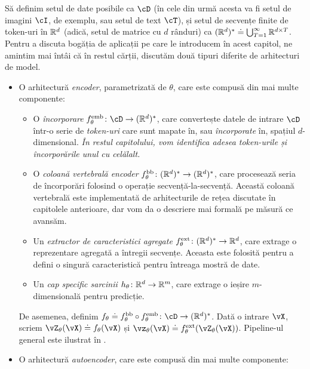 \documentclass[../../book-main_ro.tex]{subfiles}
\begin{document}
Să definim setul de date posibile ca \(\cD\) (în cele din urmă acesta va fi setul de imagini \(\cI\), de exemplu, sau setul de text \(\cT\)), și setul de secvențe finite de token-uri în \(\mathbb{R}^{d}\) (adică, setul de matrice cu \(d\) rânduri) ca \((\mathbb{R}^{d})^{*} \doteq \bigcup_{T = 1}^{\infty}\mathbb{R}^{d \times T}\). Pentru a discuta bogăția de aplicații pe care le introducem în acest capitol, ne amintim mai întâi că în restul cărții, discutăm două tipuri diferite de arhitecturi de model.
\begin{itemize}
    \item O arhitectură \textit{encoder}, parametrizată de \(\theta\), care este compusă din mai multe componente:
    \begin{itemize}
        \item O \textit{încorporare} \(f_{\theta}^{\emb} \colon \cD \to (\R^{d})^{*}\), care convertește datele de intrare \(\cD\) într-o serie de \textit{token-uri} care sunt mapate în, sau \textit{încorporate} în, spațiul \(d\)-dimensional. \textit{În restul capitolului, vom identifica adesea token-urile și încorporările unul cu celălalt.}
        \item O \textit{coloană vertebrală encoder} \(f_{\theta}^{\mathrm{bb}} \colon (\mathbb{R}^{d})^{*} \to (\mathbb{R}^{d})^{*}\), care procesează seria de încorporări folosind o operație secvență-la-secvență. Această coloană vertebrală este implementată de arhitecturile de rețea discutate în capitolele anterioare, dar vom da o descriere mai formală pe măsură ce avansăm.
        \item Un \textit{extractor de caracteristici agregate} \(f_{\theta}^{\mathrm{ext}} \colon (\mathbb{R}^{d})^{*} \to \mathbb{R}^{d}\), care extrage o reprezentare agregată a întregii secvențe. Aceasta este folosită pentru a defini o singură caracteristică pentru întreaga mostră de date.
        \item Un \textit{cap specific sarcinii} \(h_{\theta} \colon \mathbb{R}^{d} \to \mathbb{R}^{m}\), care extrage o ieșire \(m\)-dimensională pentru predicție.
    \end{itemize}
    De asemenea, definim \(f_{\theta} \doteq f_{\theta}^{\backbone} \circ f_{\theta}^{\emb} \colon \cD \to (\R^{d})^{*}\). Dată o intrare \(\vX\), scriem \(\vZ_{\theta}(\vX) \doteq f_{\theta}(\vX)\) și \(\vz_{\theta}(\vX) \doteq f_{\theta}^{\ext}(\vZ_{\theta}(\vX))\). Pipeline-ul general este ilustrat în .
    \item O arhitectură \textit{autoencoder}, care este compusă din mai multe componente:
    \begin{itemize}

\end{itemize}
\end{itemize}
\end{document}
